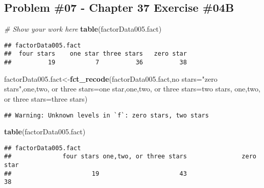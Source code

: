 \documentclass[
]{article}
\newenvironment{Shaded}{\begin{snugshade}}{\end{snugshade}}
\newcommand{\AttributeTok}[1]{\textcolor[rgb]{0.13,0.29,0.53}{#1}}
\newcommand{\CommentTok}[1]{\textcolor[rgb]{0.56,0.35,0.01}{\textit{#1}}}
\newcommand{\FunctionTok}[1]{\textcolor[rgb]{0.13,0.29,0.53}{\textbf{#1}}}
\newcommand{\NormalTok}[1]{#1}
\newcommand{\OtherTok}[1]{\textcolor[rgb]{0.56,0.35,0.01}{#1}}
\newcommand{\StringTok}[1]{\textcolor[rgb]{0.31,0.60,0.02}{#1}}
\begin{document}
\hypertarget{problem-07---chapter-37-exercise-04b}{%
\subsection{Problem \#07 - Chapter 37 Exercise
\#04B}\label{problem-07---chapter-37-exercise-04b}}

\begin{Shaded}
\begin{Highlighting}[]
\CommentTok{\# Show your work here}
\FunctionTok{table}\NormalTok{(factorData005.fact)}
\end{Highlighting}
\end{Shaded}

\begin{verbatim}
## factorData005.fact
##  four stars    one star three stars   zero star 
##          19           7          36          38
\end{verbatim}

\begin{Shaded}
\begin{Highlighting}[]
\NormalTok{factorData005.fact}\OtherTok{\textless{}{-}}\FunctionTok{fct\_recode}\NormalTok{(factorData005.fact,}\StringTok{\textasciigrave{}}\AttributeTok{no stars}\StringTok{\textasciigrave{}}\OtherTok{=}\StringTok{"zero stars"}\NormalTok{,}\StringTok{\textasciigrave{}}\AttributeTok{one,two, or three stars}\StringTok{\textasciigrave{}}\OtherTok{=}\StringTok{\textquotesingle{}one star\textquotesingle{}}\NormalTok{,}\StringTok{\textasciigrave{}}\AttributeTok{one,two, or three stars}\StringTok{\textasciigrave{}}\OtherTok{=}\StringTok{\textquotesingle{}two stars\textquotesingle{}}\NormalTok{,}
                 \StringTok{\textasciigrave{}}\AttributeTok{one,two, or three stars}\StringTok{\textasciigrave{}}\OtherTok{=}\StringTok{\textquotesingle{}three stars\textquotesingle{}}\NormalTok{)}
\end{Highlighting}
\end{Shaded}

\begin{verbatim}
## Warning: Unknown levels in `f`: zero stars, two stars
\end{verbatim}

\begin{Shaded}
\begin{Highlighting}[]
\FunctionTok{table}\NormalTok{(factorData005.fact)}
\end{Highlighting}
\end{Shaded}

\begin{verbatim}
## factorData005.fact
##              four stars one,two, or three stars               zero star 
##                      19                      43                      38
\end{verbatim}
\end{document}
